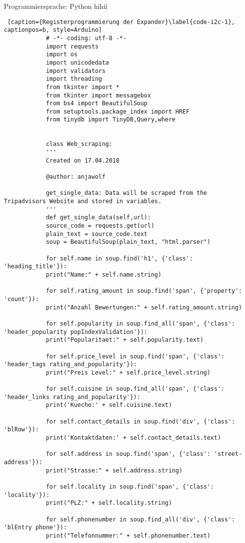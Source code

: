 \documentclass[a4paper,oneside,12pt]{report}
\begin{document}
 
		
		Programmiersprache: Python
		hihii
				
			\begin{lstlisting} [caption={Registerprogrammierung der Expander}\label{code-i2c-1}, captionpos=b, style=Arduino]
			# -*- coding: utf-8 -*-
			import requests
			import os
			import unicodedata
			import validators
			import threading
			from tkinter import *
			from tkinter import messagebox
			from bs4 import BeautifulSoup
			from setuptools.package_index import HREF
			from tinydb import TinyDB,Query,where
			
			
			class Web_scraping:
			'''
			Created on 17.04.2018
			
			@author: anjawolf
			
			get_single_data: Data will be scraped from the Tripadvisors Website and stored in variables.
			'''
			def get_single_data(self,url):
			source_code = requests.get(url)
			plain_text = source_code.text
			soup = BeautifulSoup(plain_text, "html.parser")
			
			for self.name in soup.find('h1', {'class': 'heading_title'}):
			print("Name:" + self.name.string)
			
			for self.rating_amount in soup.find('span', {'property': 'count'}):
			print("Anzahl Bewertungen:" + self.rating_amount.string)
			
			for self.popularity in soup.find_all('span', {'class': 'header_popularity popIndexValidation'}):
			print("Popularitaet:" + self.popularity.text)
			
			for self.price_level in soup.find('span', {'class': 'header_tags rating_and_popularity'}):
			print("Preis Level:" + self.price_level.string)
			
			for self.cuisine in soup.find_all('span', {'class': 'header_links rating_and_popularity'}):
			print('Kueche:' + self.cuisine.text)
			
			for self.contact_details in soup.find('div', {'class': 'blRow'}):
			print('Kontaktdaten:' + self.contact_details.text)
			
			for self.address in soup.find('span', {'class': 'street-address'}):
			print("Strasse:" + self.address.string)
			
			for self.locality in soup.find('span', {'class': 'locality'}):
			print("PLZ:" + self.locality.string)
			
			for self.phonenumber in soup.find_all('div', {'class': 'blEntry phone'}):
			print("Telefonnummer:" + self.phonenumber.text)
			
						     
			\end{lstlisting}
	
\end{document}
